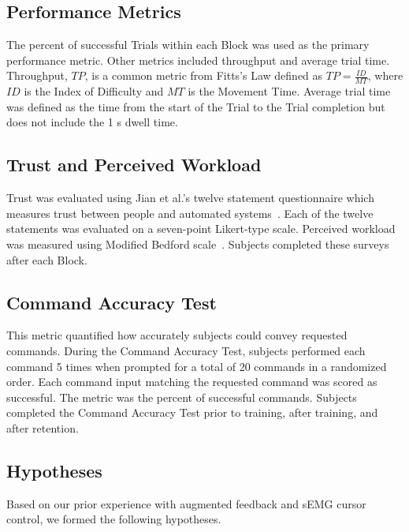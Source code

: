\subsection{Performance Metrics}
The percent of successful Trials within each Block was used as the primary performance metric.
Other metrics included throughput and average trial time.
Throughput, $TP$, is a common metric from Fitts's Law defined as $TP = \frac{ID}{MT}$, where $ID$ is the Index of Difficulty and $MT$ is the Movement Time.
Average trial time was defined as the time from the start of the Trial to the Trial completion but does not include the 1 s dwell time.

\subsection{Trust and Perceived Workload}
Trust was evaluated using Jian et al.'s twelve statement questionnaire which measures trust between people and automated systems~\citep{jian_foundations_2000}.
Each of the twelve statements was evaluated on a seven-point Likert-type scale.
Perceived workload was measured using Modified Bedford scale~\citep{roscoe_subjective_1990}.
Subjects completed these surveys after each Block.

\subsection{Command Accuracy Test}
This metric quantified how accurately subjects could convey requested commands.
During the Command Accuracy Test, subjects performed each command 5 times when prompted for a total of 20 commands in a randomized order.
Each command input matching the requested command was scored as successful.
The metric was the percent of successful commands.
Subjects completed the Command Accuracy Test prior to training, after training, and after retention.

\subsection{Hypotheses}
Based on our prior experience with augmented feedback and sEMG cursor control, we formed the following hypotheses.

